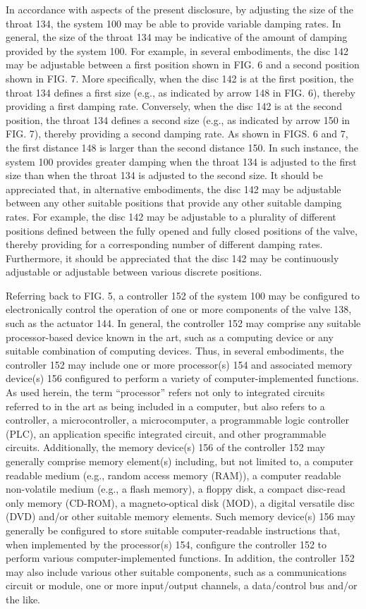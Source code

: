 \documentclass[11pt,a4paper]{article}
\begin{document}
In accordance with aspects of the present disclosure, by adjusting the size of the throat 134, the system 100 may be able to provide variable damping rates. In general, the size of the throat 134 may be indicative of the amount of damping provided by the system 100. For example, in several embodiments, the disc 142 may be adjustable between a first position shown in FIG. 6 and a second position shown in FIG. 7. More specifically, when the disc 142 is at the first position, the throat 134 defines a first size (e.g., as indicated by arrow 148 in FIG. 6), thereby providing a first damping rate. Conversely, when the disc 142 is at the second position, the throat 134 defines a second size (e.g., as indicated by arrow 150 in FIG. 7), thereby providing a second damping rate. As shown in FIGS. 6 and 7, the first distance 148 is larger than the second distance 150. In such instance, the system 100 provides greater damping when the throat 134 is adjusted to the first size than when the throat 134 is adjusted to the second size. It should be appreciated that, in alternative embodiments, the disc 142 may be adjustable between any other suitable positions that provide any other suitable damping rates. For example, the disc 142 may be adjustable to a plurality of different positions defined between the fully opened and fully closed positions of the valve, thereby providing for a corresponding number of different damping rates. Furthermore, it should be appreciated that the disc 142 may be continuously adjustable or adjustable between various discrete positions.

Referring back to FIG. 5, a controller 152 of the system 100 may be configured to electronically control the operation of one or more components of the valve 138, such as the actuator 144. In general, the controller 152 may comprise any suitable processor-based device known in the art, such as a computing device or any suitable combination of computing devices. Thus, in several embodiments, the controller 152 may include one or more processor(s) 154 and associated memory device(s) 156 configured to perform a variety of computer-implemented functions. As used herein, the term “processor” refers not only to integrated circuits referred to in the art as being included in a computer, but also refers to a controller, a microcontroller, a microcomputer, a programmable logic controller (PLC), an application specific integrated circuit, and other programmable circuits. Additionally, the memory device(s) 156 of the controller 152 may generally comprise memory element(s) including, but not limited to, a computer readable medium (e.g., random access memory (RAM)), a computer readable non-volatile medium (e.g., a flash memory), a floppy disk, a compact disc-read only memory (CD-ROM), a magneto-optical disk (MOD), a digital versatile disc (DVD) and/or other suitable memory elements. Such memory device(s) 156 may generally be configured to store suitable computer-readable instructions that, when implemented by the processor(s) 154, configure the controller 152 to perform various computer-implemented functions. In addition, the controller 152 may also include various other suitable components, such as a communications circuit or module, one or more input/output channels, a data/control bus and/or the like.
\end{document}
